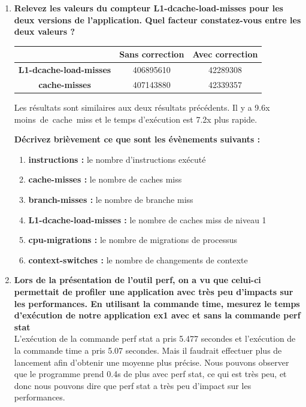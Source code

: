 \documentclass[
	a4paper, %
	10pt, %
]{CSUniSchoolLabReport}
\begin{document}
\begin{enumerate}[label=\textbf{\arabic*}]
\item \textbf{Relevez les valeurs du compteur L1-dcache-load-misses pour les deux versions de l’application. Quel facteur constatez-vous entre les deux valeurs ?}

\begin{center}
	\begin{tabular}{|c|c|c|}
		\hline
		& \textbf{Sans correction} & \textbf{Avec correction} \\
		\hline
		\textbf{L1-dcache-load-misses} & 406895610 & 42289308 \\
		\hline
		\textbf{cache-misses} & 407143880 & 42339357 \\
		\hline
	\end{tabular}
\end{center}
Les r\'esultats sont similaires aux deux r\'esultats pr\'ec\'edents. Il y a 9.6x moins\ de\ cache\ miss et le temps d'ex\'ecution est 7.2x plus rapide.

\textbf{Décrivez brièvement ce que sont les évènements suivants :}
\begin{enumerate}[label=\textbf{\alph*}]
	\item \textbf{instructions :} le nombre d'instructions ex\'ecuté
	\item \textbf{cache-misses :} le nombre de caches miss
	\item \textbf{branch-misses :} le nombre de branche miss
	\item \textbf{L1-dcache-load-misses :} le nombre de caches miss de niveau 1
	\item \textbf{cpu-migrations :} le nombre de migrations de processus
	\item \textbf{context-switches :} le nombre de changements de contexte
\end{enumerate}

\item \textbf{Lors de la présentation de l’outil perf, on a vu que celui-ci permettait de profiler une application avec très peu d’impacts sur les performances. En utilisant la commande time, mesurez le temps d’exécution de notre application ex1 avec et sans la commande perf stat}\\
L'ex\'ecution de la commande perf stat a pris 5.477 secondes et l'ex\'ecution de la commande time a pris 5.07 secondes. Mais il faudrait effectuer plus de lancement afin d'obtenir une moyenne plus précise.
Nous pouvons observer que le programme prend 0.4s de plus avec perf stat, ce qui est tr\`es peu, et donc nous pouvons dire que perf stat a très peu d'impact sur les performances.

\end{enumerate}
\end{document}

